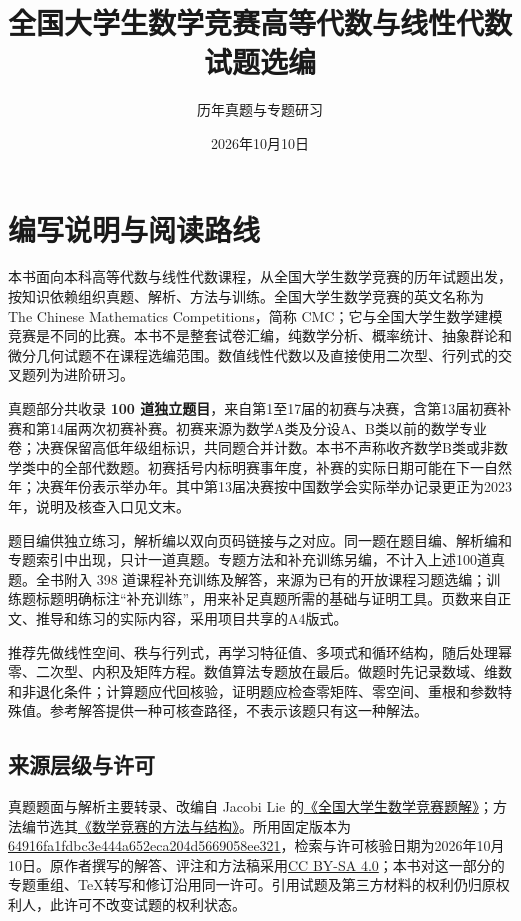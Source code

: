 \documentclass[12pt,fontset=fandol]{ctexart}
\title{全国大学生数学竞赛高等代数与线性代数试题选编}
\author{历年真题与专题研习}
\date{2026年10月10日}
\begin{document}
\maketitle
\section*{编写说明与阅读路线}
本书面向本科高等代数与线性代数课程，从全国大学生数学竞赛的历年试题出发，按知识依赖组织真题、解析、方法与训练。全国大学生数学竞赛的英文名称为 The Chinese Mathematics Competitions，简称 CMC；它与全国大学生数学建模竞赛是不同的比赛。本书不是整套试卷汇编，纯数学分析、概率统计、抽象群论和微分几何试题不在课程选编范围。数值线性代数以及直接使用二次型、行列式的交叉题列为进阶研习。

真题部分共收录 \textbf{100 道独立题目}，来自第1至17届的初赛与决赛，含第13届初赛补赛和第14届两次初赛补赛。初赛来源为数学A类及分设A、B类以前的数学专业卷；决赛保留高低年级组标识，共同题合并计数。本书不声称收齐数学B类或非数学类中的全部代数题。初赛括号内标明赛事年度，补赛的实际日期可能在下一自然年；决赛年份表示举办年。其中第13届决赛按中国数学会实际举办记录更正为2023年，说明及核查入口见文末。

题目编供独立练习，解析编以双向页码链接与之对应。同一题在题目编、解析编和专题索引中出现，只计一道真题。专题方法和补充训练另编，不计入上述100道真题。全书附入 398 道课程补充训练及解答，来源为已有的开放课程习题选编；训练题标题明确标注“补充训练”，用来补足真题所需的基础与证明工具。页数来自正文、推导和练习的实际内容，采用项目共享的A4版式。

推荐先做线性空间、秩与行列式，再学习特征值、多项式和循环结构，随后处理幂零、二次型、内积及矩阵方程。数值算法专题放在最后。做题时先记录数域、维数和非退化条件；计算题应代回核验，证明题应检查零矩阵、零空间、重根和参数特殊值。参考解答提供一种可核查路径，不表示该题只有这一种解法。

\subsection*{来源层级与许可}
真题题面与解析主要转录、改编自 Jacobi Lie 的\href{https://github.com/lzxcr/cmc-mathematics}{《全国大学生数学竞赛题解》}；方法编节选其\href{https://github.com/lzxcr/cmc-mathematics}{《数学竞赛的方法与结构》}。所用固定版本为 \href{https://github.com/lzxcr/cmc-mathematics/tree/64916fa1fdbc3e444a652eca204d5669058ee321}{64916fa1fdbc3e444a652eca204d5669058ee321}，检索与许可核验日期为2026年10月10日。原作者撰写的解答、评注和方法稿采用\href{https://creativecommons.org/licenses/by-sa/4.0/}{CC BY-SA 4.0}；本书对这一部分的专题重组、TeX转写和修订沿用同一许可。引用试题及第三方材料的权利仍归原权利人，此许可不改变试题的权利状态。
\end{document}
